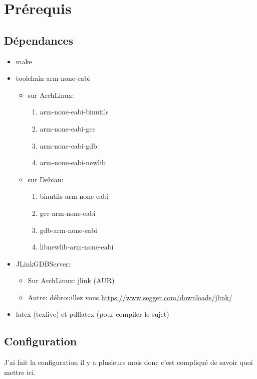 \documentclass[a4paper,10pt]{article} %
\begin{document}
\section{\label{prerequis}Prérequis}
\subsection{\label{dependances}Dépendances}
\begin{itemize}[label=$\bullet$]
    \item make
    \item toolchain arm-none-eabi
    \begin{itemize}
        \item sur ArchLinux:
        \begin{enumerate}
            \item arm-none-eabi-binutils
            \item arm-none-eabi-gcc
            \item arm-none-eabi-gdb
            \item arm-none-eabi-newlib
        \end{enumerate}
        \item sur Debian:
        \begin{enumerate}
            \item binutils-arm-none-eabi
            \item gcc-arm-none-eabi
            \item gdb-arm-none-eabi
            \item libnewlib-arm-none-eabi
        \end{enumerate}
    \end{itemize}
    \item JLinkGDBServer:
    \begin{itemize}
        \item Sur ArchLinux: jlink (AUR)
        \item Autre: débrouillez vous \href{https://www.segger.com/downloads/jlink/#J-LinkSoftwareAndDocumentationPack}{https://www.segger.com/downloads/jlink/}
    \end{itemize}
    \item latex (texlive) et pdflatex (pour compiler le sujet)
\end{itemize}

\subsection{\label{config}Configuration}
J'ai fait la configuration il y a plusieurs mois donc c'est compliqué de savoir quoi mettre ici.\\
\end{document}
